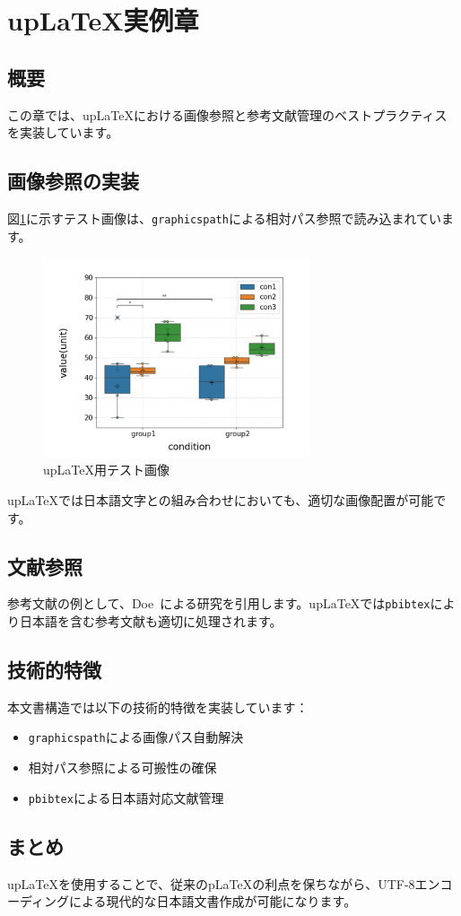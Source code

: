 \section{upLaTeX実例章}

\subsection{概要}

この章では、upLaTeXにおける画像参照と参考文献管理のベストプラクティスを実装しています。

\subsection{画像参照の実装}

図\ref{fig:test_image_up}に示すテスト画像は、\texttt{graphicspath}による相対パス参照で読み込まれています。

\begin{figure}[htbp]
    \centering
    \includegraphics[width=0.7\textwidth,bb=0 0 512 384]{figures/test/test.png}
    \caption{upLaTeX用テスト画像}
    \label{fig:test_image_up}
\end{figure}

upLaTeXでは日本語文字との組み合わせにおいても、適切な画像配置が可能です。

\subsection{文献参照}

参考文献の例として、Doe~\cite{example}による研究を引用します。upLaTeXでは\texttt{pbibtex}により日本語を含む参考文献も適切に処理されます。

\subsection{技術的特徴}

本文書構造では以下の技術的特徴を実装しています：

\begin{itemize}
    \item \texttt{graphicspath}による画像パス自動解決
    \item 相対パス参照による可搬性の確保
    \item \texttt{pbibtex}による日本語対応文献管理
\end{itemize}

\subsection{まとめ}

upLaTeXを使用することで、従来のpLaTeXの利点を保ちながら、UTF-8エンコーディングによる現代的な日本語文書作成が可能になります。
